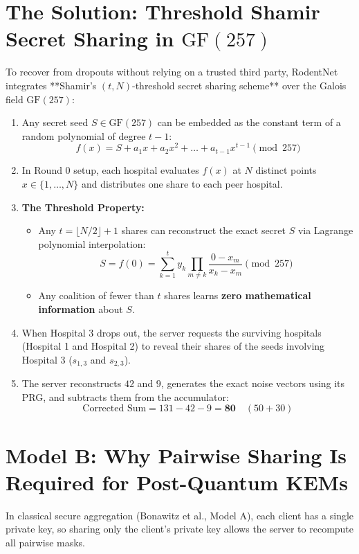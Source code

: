 \documentclass[11pt,a4paper]{report}
\begin{document}
\section{The Solution: Threshold Shamir Secret Sharing in $\text{GF}(257)$}
To recover from dropouts without relying on a trusted third party, RodentNet integrates **Shamir's $(t, N)$-threshold secret sharing scheme** over the Galois field $\text{GF}(257)$:
\begin{enumerate}[itemsep=2pt]
  \item Any secret seed $S \in \text{GF}(257)$ can be embedded as the constant term of a random polynomial of degree $t-1$:
  \begin{equation}
  f(x) = S + a_1 x + a_2 x^2 + \dots + a_{t-1} x^{t-1} \pmod{257}
  \end{equation}
  \item In Round 0 setup, each hospital evaluates $f(x)$ at $N$ distinct points $x \in \{1, \dots, N\}$ and distributes one share to each peer hospital.
  \item \textbf{The Threshold Property:}
  \begin{itemize}[itemsep=1pt]
    \item Any $t = \lfloor N/2 \rfloor + 1$ shares can reconstruct the exact secret $S$ via Lagrange polynomial interpolation:
    \begin{equation}
    S = f(0) = \sum_{k=1}^t y_k \prod_{m \ne k} \frac{0 - x_m}{x_k - x_m} \pmod{257}
    \end{equation}
    \item Any coalition of fewer than $t$ shares learns \textbf{zero mathematical information} about $S$.
  \end{itemize}
  \item When Hospital 3 drops out, the server requests the surviving hospitals (Hospital 1 and Hospital 2) to reveal their shares of the seeds involving Hospital 3 ($s_{1,3}$ and $s_{2,3}$).
  \item The server reconstructs $42$ and $9$, generates the exact noise vectors using its PRG, and subtracts them from the accumulator:
  \begin{equation}
  \text{Corrected Sum} = 131 - 42 - 9 = \mathbf{80} \quad (50 + 30)
  \end{equation}
\end{enumerate}

\section{Model B: Why Pairwise Sharing Is Required for Post-Quantum KEMs}
In classical secure aggregation (Bonawitz et al., Model A), each client has a single private key, so sharing only the client's private key allows the server to recompute all pairwise masks.
\end{document}
